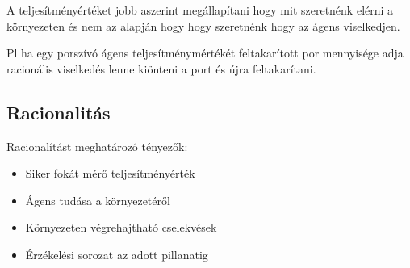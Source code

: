 \documentclass[a4paper,10pt]{scrbook}
\begin{document}
A teljesítményértéket jobb aszerint megállapítani hogy mit szeretnénk elérni a környezeten és nem 
az alapján hogy hogy szeretnénk hogy az ágens viselkedjen. 

\bigskip
\noindent
Pl ha egy porszívó ágens teljesítménymértékét feltakarított por mennyisége adja racionális viselkedés
lenne kiönteni a port és újra feltakarítani. 

\subsection{Racionalitás}

Racionalítást meghatározó tényezők:

\begin{itemize}
\item{Siker fokát mérő teljesítményérték}
\item{Ágens tudása a környezetéről}
\item{Környezeten végrehajtható cselekvések}
\item{Érzékelési sorozat az adott pillanatig} 
\end{itemize}
\end{document}

